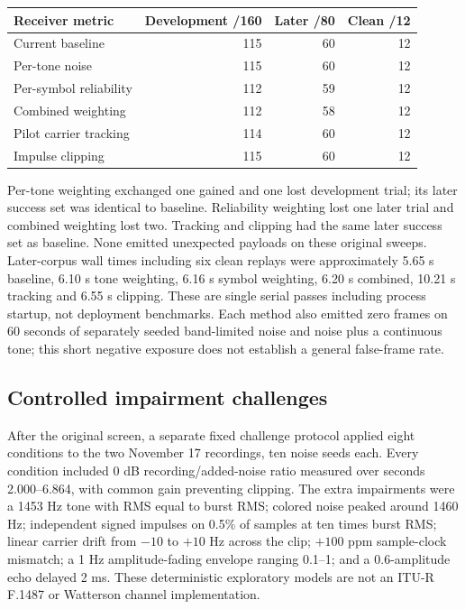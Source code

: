 \documentclass[11pt,a4paper]{article}
\begin{document}
\begin{center}
\begin{tabular}{lrrr}
\toprule
Receiver metric & Development /160 & Later /80 & Clean /12 \\
\midrule
Current baseline & 115 & 60 & 12 \\
Per-tone noise & 115 & 60 & 12 \\
Per-symbol reliability & 112 & 59 & 12 \\
Combined weighting & 112 & 58 & 12 \\
Pilot carrier tracking & 114 & 60 & 12 \\
Impulse clipping & 115 & 60 & 12 \\
\bottomrule
\end{tabular}
\end{center}

Per-tone weighting exchanged one gained and one lost development trial; its
later success set was identical to baseline. Reliability weighting lost one
later trial and combined weighting lost two. Tracking and clipping had the
same later success set as baseline. None emitted unexpected payloads on
these original sweeps. Later-corpus wall times including six clean replays
were approximately 5.65 s baseline, 6.10 s tone weighting, 6.16 s symbol
weighting, 6.20 s combined, 10.21 s tracking and 6.55 s clipping. These are
single serial passes including process startup, not deployment benchmarks.
Each method also emitted zero frames on 60 seconds of separately seeded
band-limited noise and noise plus a continuous tone; this short negative
exposure does not establish a general false-frame rate.

\subsection{Controlled impairment challenges}
After the original screen, a separate fixed challenge protocol applied eight
conditions to the two November 17 recordings, ten noise seeds each. Every
condition included 0 dB recording/added-noise ratio measured over seconds
2.000--6.864, with common gain preventing clipping. The extra impairments
were a 1453 Hz tone with RMS equal to burst RMS; colored noise peaked around
1460 Hz; independent signed impulses on 0.5\% of samples at ten times burst
RMS; linear carrier drift from $-10$ to $+10$ Hz across the clip; $+100$ ppm
sample-clock mismatch; a 1 Hz amplitude-fading envelope ranging 0.1--1; and a
0.6-amplitude echo delayed 2 ms. These deterministic exploratory models are
not an ITU-R F.1487 or Watterson channel implementation.
\end{document}
